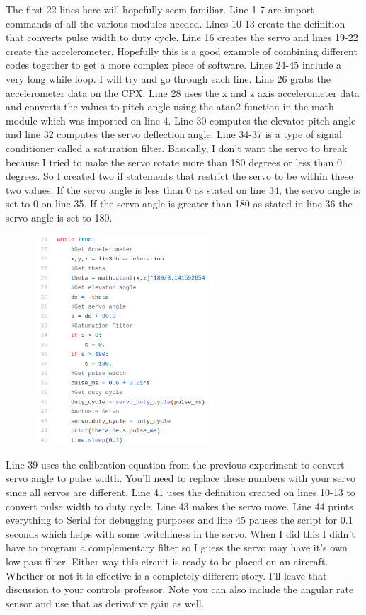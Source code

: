 The first 22 lines here will hopefully seem familiar. Line 1-7 are import commands of all the various modules needed. Lines 10-13 create the definition that converts pulse width to duty cycle. Line 16 creates the servo and lines 19-22 create the accelerometer. Hopefully this is a good example of combining different codes together to get a more complex piece of software. Lines 24-45 include a very long while loop. I will try and go through each line. Line 26 grabs the accelerometer data on the CPX. Line 28 uses the x and z axis accelerometer data and converts the values to pitch angle using the atan2 function in the math module which was imported on line 4. Line 30 computes the elevator pitch angle and line 32 computes the servo deflection angle. Line 34-37 is a type of signal conditioner called a saturation filter. Basically, I don’t want the servo to break because I tried to make the servo rotate more than 180 degrees or less than 0 degrees. So I created two if statements that restrict the servo to be within these two values. If the servo angle is less than 0 as stated on line 34, the servo angle is set to 0 on line 35. If the servo angle is greater than 180 as stated in line 36 the servo angle is set to 180.
\begin{figure}[H]
  \begin{center}
    \includegraphics[width=0.6\textwidth]{Figures/feedback2.png}
  \end{center}
\end{figure}
Line 39 uses the calibration equation from the previous experiment to convert servo angle to pulse width. You’ll need to replace these numbers with your servo since all servos are different. Line 41 uses the definition created on lines 10-13 to convert pulse width to duty cycle. Line 43 makes the servo move. Line 44 prints everything to Serial for debugging purposes and line 45 pauses the script for 0.1 seconds which helps with some twitchiness in the servo. When I did this I didn’t have to program a complementary filter so I guess the servo may have it’s own low pass filter. Either way this circuit is ready to be placed on an aircraft. Whether or not it is effective is a completely different story. I’ll leave that discussion to your controls professor. Note you can also include the angular rate sensor and use that as derivative gain as well.

